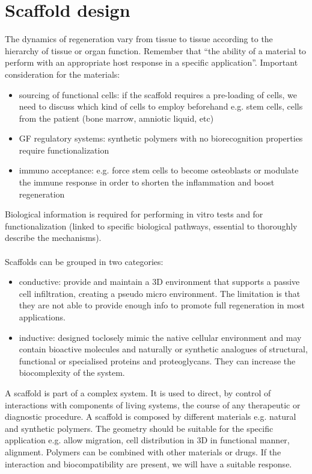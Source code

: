 \graphicspath{{chapters/scaffold/}}
\chapter{Scaffold design}

The dynamics of regeneration vary from tissue to tissue according to the hierarchy of tissue or organ function. 
Remember that “the ability of a material to perform with an appropriate host response in a specific application”.
Important consideration for the materials: 
\begin{itemize}
\item sourcing of functional cells: if the scaffold requires a pre-loading of cells, we need to discuss which kind of cells to employ beforehand e.g. stem cells, cells from the patient (bone marrow, amniotic liquid, etc)
\item GF regulatory systems: synthetic polymers with no biorecognition properties require functionalization
\item immuno acceptance: e.g. force stem cells to become osteoblasts or modulate the immune response in order to shorten the inflammation and boost regeneration
\end{itemize}
\noindent
Biological information is required for performing in vitro tests and for functionalization (linked to specific biological pathways, essential to thoroughly describe the mechanisms).
\\
\\
\noindent
Scaffolds can be grouped in two categories:
\begin{itemize}
\item conductive: provide and maintain a 3D environment that supports a passive cell infiltration, creating a pseudo micro environment. The limitation is that they are not able to provide enough info to promote full regeneration in most applications.
\item  inductive: designed toclosely mimic the native cellular environment and may contain bioactive molecules and naturally or synthetic analogues of structural, functional or specialised proteins and proteoglycans. They can increase the biocomplexity of the system.
\end{itemize}
\noindent
A scaffold is part of a complex system. It is used to direct, by control of interactions with components of living systems, the course of any therapeutic or diagnostic procedure.
A scaffold is composed by different materials e.g. natural and synthetic polymers. 
The geometry should be suitable for the specific application e.g. allow migration, cell distribution in 3D in functional manner, alignment. 
Polymers can be combined with other materials or drugs.
If the interaction and biocompatibility are present, we will have a suitable response.

